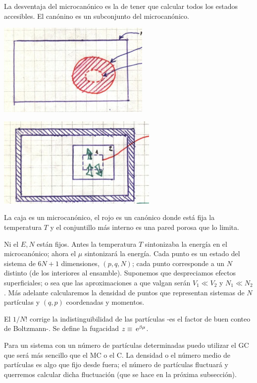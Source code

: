 \documentclass[10pt,oneside]{CBFT_book}
\begin{document}
La desventaja del microcanónico es la de tener que calcular todos los estados accesibles.
El canónino es un subconjunto del microcanónico.

\includegraphics[scale=0.5]{images/1606329345.jpg} 

\includegraphics[scale=0.5]{images/1606329430.jpg} 

La caja es un microcanónico, el rojo es un canónico donde está fija la temperatura $T$ y el
conjuntillo más interno es una pared porosa que lo limita.

Ni el $E,N$ están fijos. Antes la temperatura $T$ sintonizaba la energía en el microcanónico; ahora
el $\mu$ sintonizará la energía.
Cada punto es un estado del sistema de $6N+1$ dimensiones, $(p,q,N)$; cada punto corresponde a un
$N$ distinto (de los interiores al ensamble).
Suponemos que despreciamos efectos superficiales; o sea que las aproximaciones a que valgan serán
$ V_1 \ll V_2 $ y $ N_1 \ll N_2 $.
Más adelante calcularemos la densidad de puntos que representan sistemas de $N$ partículas y
$(q,p)$ coordenadas y momentos.

El $1/N!$ corrige la indistinguibilidad de las partículas -es el factor de buen conteo de Boltzmann-.
Se define la fugacidad $ z \equiv \:\mathrm{e}^{ \beta \mu } $.

Para un sistema con un número de partículas determinadas puedo utilizar el GC que será más sencillo
que el MC o el C. La densidad o el número medio de partículas es algo que fijo desde fuera; el número
de partículas fluctuará y querremos calcular dicha fluctuación (que se hace en la próxima
subsección).
\end{document}
